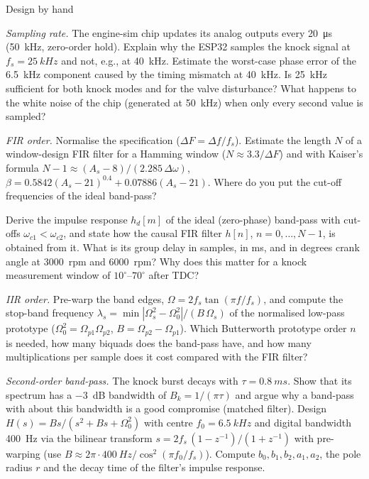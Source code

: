 \begin{exercise}{Design by hand}{\Paper}
\begin{tasks}
  \item \emph{Sampling rate.} The engine-sim chip updates its analog outputs
    every \SI{20}{\micro s} (\SI{50}{kHz}, zero-order hold). Explain why the
    ESP32 samples the knock signal at $f_s=\SI{25}{kHz}$ and not, e.g., at
    \SI{40}{kHz}. Estimate the worst-case phase error of the \SI{6.5}{kHz}
    component caused by the timing mismatch at \SI{40}{kHz}. Is
    \SI{25}{kHz} sufficient for both knock modes and for the valve
    disturbance? What happens to the white noise of the chip (generated at
    \SI{50}{kHz}) when only every second value is sampled?
  \item \emph{FIR order.} Normalise the specification ($\Delta F=\Delta f/f_s$).
    Estimate the length $N$ of a window-design FIR filter for a Hamming window
    ($N\approx 3.3/\Delta F$) and with Kaiser's formula
    $N-1\approx (A_s-8)/(2.285\,\Delta\omega)$, $\beta=0.5842(A_s-21)^{0.4}+0.07886(A_s-21)$.
    Where do you put the cut-off frequencies of the ideal band-pass?
  \item Derive the impulse response $h_d[m]$ of the ideal (zero-phase)
    band-pass with cut-offs $\omega_{c1}<\omega_{c2}$, and state how the
    causal FIR filter $h[n]$, $n=0,\dots,N-1$, is obtained from it.
    What is its group delay in samples, in ms, and in degrees crank angle at
    \SI{3000}{rpm} and \SI{6000}{rpm}? Why does this matter for a knock
    measurement window of $10^\circ$--$70^\circ$ after TDC?
  \item \emph{IIR order.} Pre-warp the band edges,
    $\Omega=2f_s\tan(\pi f/f_s)$, and compute the stop-band frequency
    $\lambda_s=\min |\Omega_s^2-\Omega_0^2|/(B\,\Omega_s)$ of the normalised
    low-pass prototype ($\Omega_0^2=\Omega_{p1}\Omega_{p2}$,
    $B=\Omega_{p2}-\Omega_{p1}$). Which Butterworth prototype order $n$ is
    needed, how many biquads does the band-pass have, and how many
    multiplications per sample does it cost compared with the FIR filter?
  \item \emph{Second-order band-pass.} The knock burst decays with
    $\tau=\SI{0.8}{ms}$. Show that its spectrum has a \SI{-3}{dB} bandwidth of
    $B_k=1/(\pi\tau)$ and argue why a band-pass with about this bandwidth is
    a good compromise (matched filter).
    Design $H(s)=B s/(s^2+Bs+\Omega_0^2)$ with centre $f_0=\SI{6.5}{kHz}$ and
    digital bandwidth \SI{400}{Hz} via the bilinear transform
    $s=2f_s\,(1-z^{-1})/(1+z^{-1})$ with pre-warping
    (use $B\approx 2\pi\cdot\SI{400}{Hz}/\cos^2(\pi f_0/f_s)$).
    Compute $b_0,b_1,b_2,a_1,a_2$, the pole radius $r$ and the decay time
    of the filter's impulse response.
\end{tasks}
\end{exercise}

